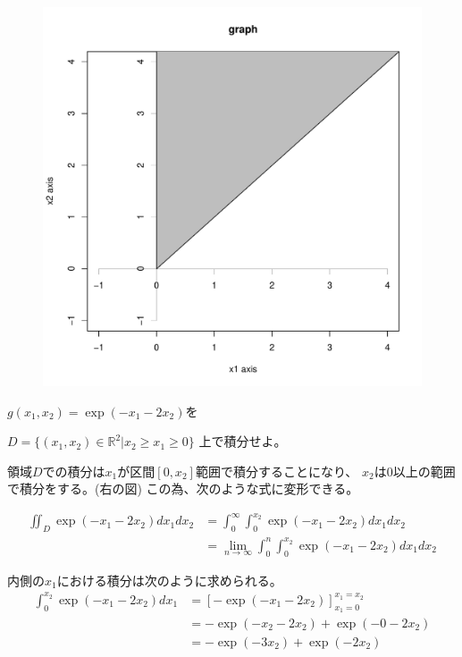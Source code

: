 \documentclass[12pt,b5paper]{ltjsarticle}
\begin{document}
\begin{figure}
 \includegraphics[scale=0.3]{graph_R.pdf}
\end{figure}



$g(x_1, x_2) = \exp(-x_1 -2x_2)$を

$D=\{ (x_1, x_2) \in \mathbb{R}^2 | x_2 \geq x_1 \geq 0 \}$
上で積分せよ。

\hrulefill


領域$D$での積分は$x_1$が区間$[0, x_2]$範囲で積分することになり、
$x_2$は$0$以上の範囲で積分をする。(右の図)
この為、次のような式に変形できる。

\begin{align}
 \iint_{D} \exp(-x_1 -2x_2) d{x_1} d{x_2}
  &= \int_0^{\infty} \int_0^{x_2} \exp(-x_1 -2x_2) d{x_1} d{x_2}\\
  &= \lim_{n \rightarrow \infty}\int_0^{n} \int_0^{x_2} \exp(-x_1 -2x_2) d{x_1} d{x_2}\label{020542_28Mar22}
\end{align}

内側の$x_1$における積分は次のように求められる。
\begin{align}
  \int_0^{x_2} \exp(-x_1 -2x_2) d{x_1}
 &= \left[ -\exp(-x_1 -2x_2) \right]_{x_1=0}^{x_1=x_2}\\
 &= -\exp(-x_2 -2x_2) +\exp(-0 -2x_2)\\
 &= -\exp( -3x_2) +\exp( -2x_2)
\end{align}
\end{document}
